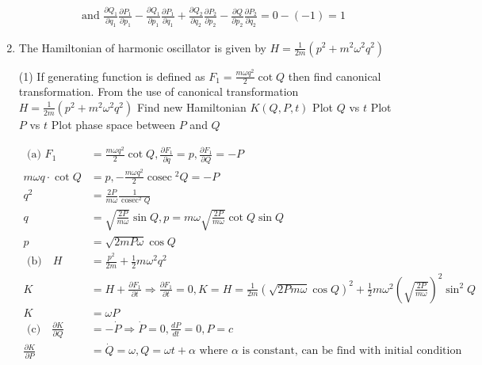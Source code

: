 \begin{enumerate}
\begin{answer}
\begin{align*}
		&\text{and }
		\frac{\partial Q_{1}}{\partial q_{1}} \frac{\partial P_{1}}{\partial p_{1}}-\frac{\partial Q_{1}}{\partial p_{1}} \frac{\partial P_{1}}{\partial q_{1}}+\frac{\partial Q_{2}}{\partial q_{2}} \frac{\partial P_{2}}{\partial p_{2}}-\frac{\partial Q}{\partial p_{2}} \frac{\partial P_{2}}{\partial q_{2}}=0-(-1)=1
		\end{align*}
	\end{answer}
	\item The Hamiltonian of harmonic oscillator is given by $H=\frac{1}{2 m}\left(p^{2}+m^{2} \omega^{2} q^{2}\right)$
\begin{tasks}(1)
	\task[\textbf{a.}]If generating function is defined as $F_{1}=\frac{m \omega q^{2}}{2} \cot Q$ then find canonical transformation.
	From the use of canonical transformation $H=\frac{1}{2 m}\left(p^{2}+m^{2} \omega^{2} q^{2}\right)$
	\task[\textbf{b.}]Find new Hamiltonian $K(Q, P, t)$
	\task[\textbf{c.}] Plot $Q$ vs $t$
	\task[\textbf{d.}]  Plot $P$ vs $t$
	\task[\textbf{e.}]Plot phase space between $P$ and $Q$
\end{tasks} 
\begin{answer}
	\begin{align*}
	\text { (a) } F_{1}&=\frac{m \omega q^{2}}{2} \cot Q, \frac{\partial F_{1}}{\partial q}=p, \frac{\partial F_{1}}{\partial Q}=-P\\
	m \omega q \cdot \cot Q&=p,-\frac{m \omega q^{2}}{2} \operatorname{cosec}{ }^{2} Q=-P\\
	q^{2}&=\frac{2 P}{m \omega} \frac{1}{\operatorname{cosec}^{2} Q}\\
	q&=\sqrt{\frac{2 P}{m \omega}} \sin Q, p=m \omega \sqrt{\frac{2 P}{m \omega}} \cot Q \sin Q\\
	p&=\sqrt{2 m P \omega} \cos Q\\
\text{	(b)}\quad
	H&=\frac{p^{2}}{2 m}+\frac{1}{2} m \omega^{2} q^{2}\\
	K&=H+\frac{\partial F_{1}}{\partial t} \Rightarrow \frac{\partial F_{1}}{\partial t}=0, K=H=\frac{1}{2 m}(\sqrt{2 P m \omega} \cos Q)^{2}+\frac{1}{2} m \omega^{2}\left(\sqrt{\frac{2 P}{m \omega}}\right)^{2} \sin ^{2} Q\\
	K&=\omega P\\
\text{	(c)}\quad
	\frac{\partial K}{\partial Q}&=-\dot{P} \Rightarrow \dot{P}=0, \frac{d P}{d t}=0, P=c\\
	\frac{\partial K}{\partial P}&=\dot{Q}=\omega, Q=\omega t+\alpha \text { where } \alpha \text { is constant, can be find with initial condition }
	\end{align*}

\end{answer}
\end{enumerate}
